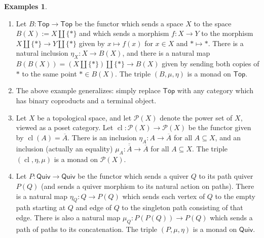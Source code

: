 \documentclass{article}
\theoremstyle{definition}
\newtheorem{examples}{Examples}
\begin{document}
\begin{examples}
\begin{enumerate}[label = \textbf{\Alph*.}]
    \item Let $B : \mathsf{Top} \to \mathsf{Top}$ be the functor which sends a space $X$ to the space $B(X) := X \amalg \{*\}$ and which sends a morphism $f : X \to Y$ to the morphism $X \amalg \{*\} \to Y \amalg \{*\}$ given by $x \mapsto f(x)$ for $x \in X$ and $* \mapsto *$. There is a natural inclusion $\eta_X : X \to B(X)$, and there is a natural map $B(B(X)) = (X \amalg \{*\}) \amalg \{*\} \to B(X)$ given by sending both copies of $*$ to the same point $* \in B(X)$. The triple $(B,\mu,\eta)$ is a monad on $\mathsf{Top}$.
    \item The above example generalizes: simply replace $\mathsf{Top}$ with any category which has binary coproducts and a terminal object.
    \item Let $X$ be a topological space, and let $\mathcal{P}(X)$ denote the power set of $X$, viewed as a poset category. Let $\operatorname{cl} : \mathcal{P}(X) \to \mathcal{P}(X)$ be the functor given by $\operatorname{cl}(A) = \overline{A}$. There is an inclusion $\eta_A : A \to \overline{A}$ for all $A \subseteq X$, and an inclusion (actually an equality) $\mu_A : \overline{\overline{A}} \to \overline{A}$ for all $A \subseteq X$. The triple $(\operatorname{cl}, \eta, \mu)$ is a monad on $\mathcal{P}(X)$.
    \item Let $P : \mathsf{Quiv} \to \mathsf{Quiv}$ be the functor which sends a quiver $Q$ to its path quiver $P(Q)$ (and sends a quiver morphism to its natural action on paths). There is a natural map $\eta_Q : Q \to P(Q)$ which sends each vertex of $Q$ to the empty path starting at $Q$ and edge of $Q$ to the singleton path consisting of that edge. There is also a natural map $\mu_Q : P(P(Q)) \to P(Q)$ which sends a path of paths to its concatenation. The triple $(P,\mu,\eta)$ is a monad on $\mathsf{Quiv}$.
\end{enumerate}
\end{examples}
\end{document}
